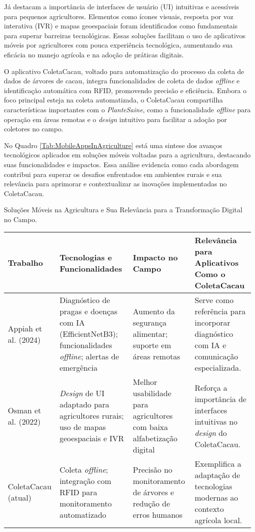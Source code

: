Já \cite{Osman2022MOBILEUI} destacam a importância de interfaces de usuário (UI) intuitivas e acessíveis para pequenos agricultores. Elementos como ícones visuais, resposta por voz interativa (IVR) e mapas geoespaciais foram identificados como fundamentais para superar barreiras tecnológicas. Essas soluções facilitam o uso de aplicativos móveis por agricultores com pouca experiência tecnológica, aumentando sua eficácia no manejo agrícola e na adoção de práticas digitais.

O aplicativo ColetaCacau, voltado para automatização do processo da coleta de dados de árvores de cacau, integra funcionalidades de coleta de dados \textit{offline} e identificação automática com RFID, promovendo precisão e eficiência. Embora o foco principal esteja na coleta automatizada, o ColetaCacau compartilha características importantes com o \textit{PlanteSaine}, como a funcionalidade \textit{offline} para operação em áreas remotas e o \textit{design} intuitivo para facilitar a adoção por coletores no campo.

No Quadro \ref{Tab:MobileAppsInAgriculture} está uma sintese dos avanços tecnológicos aplicados em soluções móveis voltadas para a agricultura, destacando suas funcionalidades e impactos. Essa análise evidencia como cada abordagem contribui para superar os desafios enfrentados em ambientes rurais e sua relevância para aprimorar e contextualizar as inovações implementadas no ColetaCacau.

\begin{quadro}[H]
    \centering
    \footnotesize
    \caption{Soluções Móveis na Agricultura e Sua Relevância para a Transformação Digital no Campo.}
    \begin{tabular}{|p{3cm}|p{3cm}|p{3cm}|p{4cm}|}
       \hline
       \textbf{Trabalho} & \textbf{Tecnologias e Funcionalidades} & \textbf{Impacto no Campo} & \textbf{Relevância para Aplicativos Como o ColetaCacau}\\
       \hline
       Appiah et al. (2024) & Diagnóstico de pragas e doenças com IA (EfficientNetB3); funcionalidades \textit{offline}; alertas de emergência & Aumento da segurança alimentar; suporte em áreas remotas & Serve como referência para incorporar diagnóstico com IA e comunicação especializada. \\
       \hline
       Osman et al. (2022) & \textit{Design} de UI adaptado para agricultores rurais; uso de mapas geoespaciais e IVR & Melhor usabilidade para agricultores com baixa alfabetização digital & Reforça a importância de interfaces intuitivas no \textit{design} do ColetaCacau. \\
       \hline
       ColetaCacau (atual) & Coleta \textit{offline}; integração com RFID para monitoramento automatizado & Precisão no monitoramento de árvores e redução de erros humanos & Exemplifica a adaptação de tecnologias modernas ao contexto agrícola local. \\
       \hline
    \end{tabular}
    \label{Tab:MobileAppsInAgriculture}
\end{quadro}

